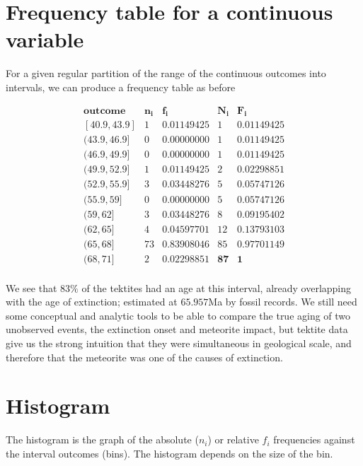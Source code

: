 \documentclass[
]{book}
\begin{document}
\hypertarget{frequency-table-for-a-continuous-variable}{%
\section{Frequency table for a continuous variable}\label{frequency-table-for-a-continuous-variable}}

For a given regular partition of the range of the continuous outcomes into intervals, we can produce a frequency table as before

\[
\begin{array}{ccccc}
\mathbf{outcome} & \mathbf{n_i} & \mathbf{f_i} & \mathbf{N_i} & \mathbf{F_i}\\
\mathrm{[40.9,43.9]} & 1 & 0.01149425 &  1 & 0.01149425 \\ 
\mathrm{(43.9,46.9]} & 0 & 0.00000000 & 1 & 0.01149425 \\ 
\mathrm{(46.9,49.9]} & 0 & 0.00000000 &  1 & 0.01149425 \\ 
\mathrm{(49.9,52.9]} & 1 & 0.01149425 & 2 & 0.02298851 \\ 
\mathrm{(52.9,55.9]} & 3 & 0.03448276 &  5 & 0.05747126 \\ 
\mathrm{(55.9,59]} & 0 & 0.00000000 &  5 & 0.05747126 \\ 
\mathrm{(59,62]} & 3 & 0.03448276 &  8 & 0.09195402 \\ 
\mathrm{(62,65]} & 4 & 0.04597701 & 12 & 0.13793103 \\ 
\mathrm{(65,68]} & 73 & 0.83908046 & 85 & 0.97701149 \\ 
\mathrm{(68,71]} & 2 & 0.02298851 & \mathbf{87} & \mathbf{1} \\
\end{array}
\]

We see that \(83\%\) of the tektites had an age at this interval, already overlapping with the age of extinction; estimated at \(65.957\)Ma by fossil records. We still need some conceptual and analytic tools to be able to compare the true aging of two unobserved events, the extinction onset and meteorite impact, but tektite data give us the strong intuition that they were simultaneous in geological scale, and therefore that the meteorite was one of the causes of extinction.

\hypertarget{histogram}{%
\section{Histogram}\label{histogram}}

The histogram is the graph of the absolute (\(n_i\)) or relative \(f_i\) frequencies against the interval outcomes (bins). The histogram depends on the size of the bin.
\end{document}
